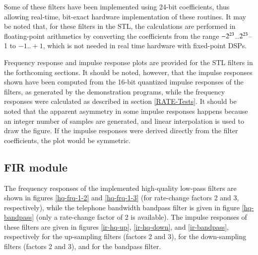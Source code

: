 Some of these filters have been implemented using 24-bit coefficients,
thus allowing real-time, bit-exact hardware implementation of these
routines. It may be noted that, for these filters in the STL, the
calculations are performed in floating-point arithmetics by converting
the coefficients from the range $\rm -2^{23}$..$\rm 2^{23}$--1 to $-1
.. +1$, which is not needed in real time hardware with fixed-point
DSPs.

Frequency response and impulse response plots are provided for the
STL filters in the forthcoming sections. It should be noted,
however, that the impulse responses shown have been computed from
the 16-bit quantized impulse responses of the filters, as generated
by the demonstration programs, while the frequency responses were
calculated as described in section \ref{RATE-Tests}. It should be
noted that the apparent asymmetry in some impulse responses happens
because an integer number of samples are generated, and linear
interpolation is used to draw the figure. If the impulse responses
were derived directly from the filter coefficients, the plot would
be symmetric.




\subsection{FIR module}

The frequency responses of the implemented high-quality low-pass
filters are shown in figures \ref{hq-frq-1-2} and \ref{hq-frq-1-3}
(for rate-change factors 2 and 3, respectively), while the telephone
bandwidth bandpass filter is given in figure \ref{hq-bandpass} (only
a rate-change factor of 2 is available). The impulse responses of
these filters are given in figures \ref{ir-hq-up}, \ref{ir-hq-down},
and \ref{ir-bandpass}, respectively for the up-sampling filters
(factors 2 and 3), for the down-sampling filters (factors 2 and 3),
and for the bandpass filter.

